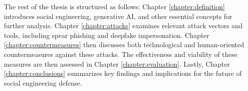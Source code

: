 %
%

The rest of the thesis is structured as follows: Chapter \ref{chapter:definition} introduces social engineering, generative AI, and other essential concepts for further analysis. Chapter \ref{chapter:attacks} examines relevant attack vectors and tools, including spear phishing and deepfake impersonation. Chapter \ref{chapter:countermeasures} then discusses both technological and human-oriented countermeasures against these attacks. The effectiveness and viability of these measures are then assessed in Chapter \ref{chapter:evaluation}. Lastly, Chapter \ref{chapter:conclusions} summarizes key findings and implications for the future of social engineering defense.











